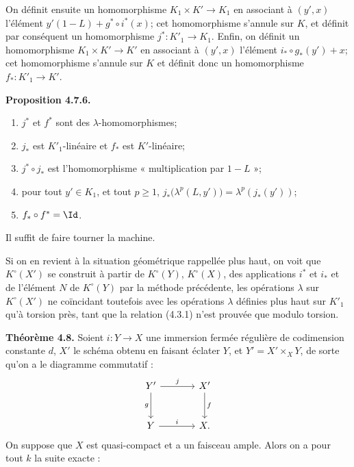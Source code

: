 On
définit ensuite un homomorphisme \(K_1\times K'\to K_1\) en associant à \((y',x)\) l'élément \(y'(1-L)+g^*\circ i^*(x)\); cet homomorphisme s'annule sur \(K\), et définit par conséquent un homomorphisme \(j^*:K'_1\longrightarrow K_1\). Enfin, on définit un homomorphisme \(K_1\times K'\to K'\) en associant à \((y',x)\) l'élément \(i_*\circ g_*(y')+x\); cet homomorphisme s'annule sur \(K\) et définit donc un homomorphisme \(f_*:K'_1\longrightarrow K'\).

\textbf{Proposition 4.7.6.}
\begin{enumerate}[label=\roman*)]
\item \(j^*\) et \(f^*\) sont des \(\lambda\)-homomorphismes;
\item \(j_*\) est \(K'_1\)-linéaire et \(f_*\) est \(K'\)-linéaire;
\item \(j^*\circ j_*\) est l'homomorphisme « multiplication par \(1-L\) »;
\item pour tout \(y'\in K_1\), et tout \(p\ge1\), \(j_*\bigl(\lambda^p(L,y')\bigr)=\lambda^p(j_*(y'))\);
\item \(f_*\circ f^*=\Id\).
\end{enumerate}

Il suffit de faire tourner la machine.

Si on en revient à la situation géométrique rappellée plus haut, on voit que \(K^\circ(X')\) se construit à partir de \(K^\circ(Y)\), \(K^\circ(X)\), des applications \(i^*\) et \(i_*\) et de l'élément \(N\) de \(K^\circ(Y)\) par la méthode précédente, les opérations \(\lambda\) sur \(K^\circ(X')\) ne coïncidant toutefois avec les opérations \(\lambda\) définies plus haut sur \(K'_1\) qu'à torsion près, tant que la relation (4.3.1) n'est prouvée que modulo torsion.

\textbf{Théorème 4.8.} Soient \(i:Y\to X\) une immersion fermée régulière de codimension constante \(d\), \(X'\) le schéma obtenu en faisant éclater \(Y\), et \(Y'=X'\times_XY\), de sorte qu'on a le diagramme commutatif :
\[
\begin{tikzcd}[column sep=large,row sep=large]
Y' \arrow[r,"j"] \arrow[d,"g"'] & X' \arrow[d,"f"]\\
Y \arrow[r,"i"] & X.
\end{tikzcd}
\]
On suppose que \(X\) est quasi-compact et a un faisceau ample. Alors on a pour tout \(k\) la suite
exacte :
